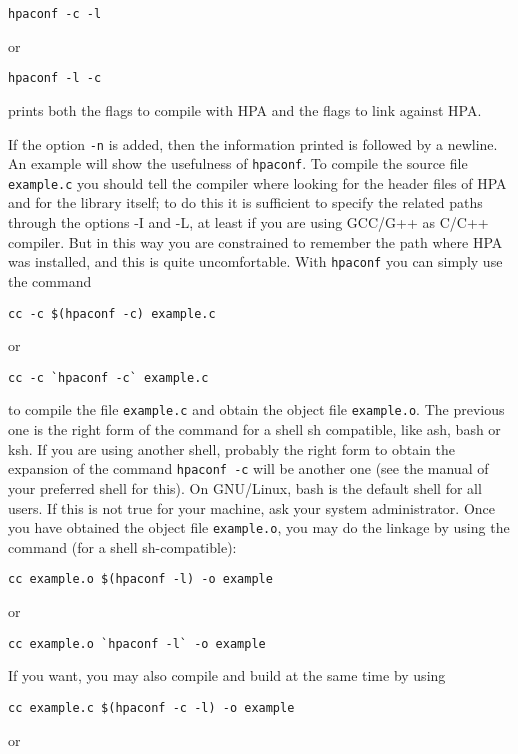 \documentclass{article}
\begin{document}
\begin{verbatim}
hpaconf -c -l 
\end{verbatim}
or 

\begin{verbatim}
hpaconf -l -c
\end{verbatim}
prints both the flags to compile with HPA and the flags to link against HPA.

If the option \texttt{-n} is added, then the information printed is followed
by a newline. 
An example will show the usefulness of \texttt{hpaconf}.
To compile the source file \texttt{example.c} you should tell the compiler 
where looking for the header files of HPA and for the library itself; 
to do this it is sufficient to specify the related paths through the options
-I and -L, at least if you are using GCC/G++ as C/C++ compiler.
But in this way you are constrained to remember the path
where HPA was installed, and this is quite uncomfortable.
With \texttt{hpaconf} you can simply use the command

\begin{verbatim}
cc -c $(hpaconf -c) example.c
\end{verbatim}
or

\begin{verbatim}
cc -c `hpaconf -c` example.c
\end{verbatim}
to compile the file \texttt{example.c} and obtain the object file \texttt{example.o}.
The previous one is the right form of the command 
for a shell sh compatible, like ash, bash or ksh. 
If you are using another shell, probably the
right form to obtain the expansion of the command \texttt{hpaconf -c}
will be another one (see the manual of your preferred shell for this).
On GNU/Linux, bash is the default shell for all users. If this is
not true for your machine, ask your system administrator.
Once you have obtained the object file \texttt{example.o}, you may do the linkage
by using the command (for a shell sh-compatible):

\begin{verbatim}
cc example.o $(hpaconf -l) -o example
\end{verbatim}
or

\begin{verbatim}
cc example.o `hpaconf -l` -o example
\end{verbatim}
If you want, you may also compile and build at the same time by using

\begin{verbatim}
cc example.c $(hpaconf -c -l) -o example
\end{verbatim}
or
\end{document}
